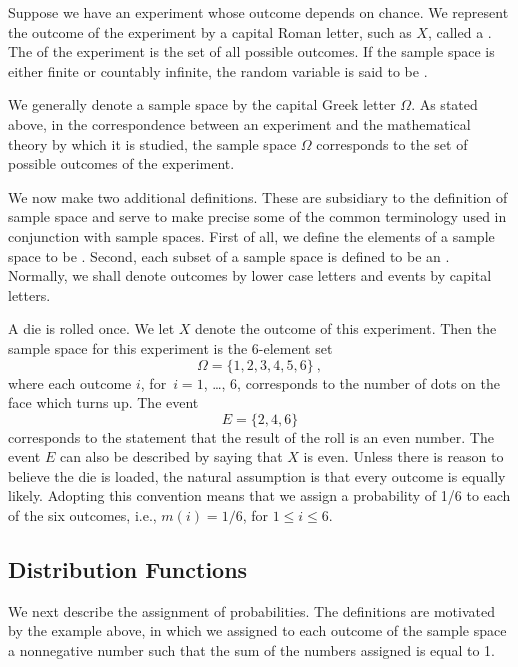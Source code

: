 \begin{definition}\label{def 1.1} 
Suppose we have an experiment whose outcome depends on chance.
We represent the outcome of the experiment by
a capital Roman letter, such as $X$, called a .
The  of the experiment is the set of all possible 
outcomes.  If the sample space is either finite or countably infinite, the random variable
is said to be .
\end{definition}
We generally denote a sample space by the capital Greek letter $\Omega$.  As
stated above, in the correspondence between an experiment and the
mathematical theory by which it is studied, the sample space $\Omega$ corresponds to the
set of possible outcomes of the experiment.    
\par
We now make two additional definitions.  These are subsidiary to the
definition of sample space and serve to make precise some of the common terminology used
in conjunction with sample spaces.  First of all, we define the elements of a sample space
to be .  Second, each subset of a sample space is defined to be 
an . Normally, we shall denote outcomes by lower case letters and
events  by capital letters.
 
\begin{example}\label{exam 1.5}
A die is rolled once.  We let $X$ denote the outcome of this experiment.  Then the sample
space for this experiment is the 6-element set
$$
\Omega = \{1,2,3,4,5,6\}\ ,
$$
where each outcome $i$, for~$i = 1$, \dots, 6, corresponds to the number of
dots on the face which turns up.  The event
$$
E = \{2,4,6\}
$$
corresponds to the statement that the result of the roll is an even number.  The event $E$
can also be described by saying that $X$ is even.  Unless there is reason to believe the die is
loaded, the natural assumption is that every outcome is equally likely.  Adopting this
convention means that we assign a probability of 1/6 to each of the six outcomes, i.e., $m(i) =
1/6$, for $1 \le i \le 6$.
\end{example}

\subsection*{Distribution Functions}

We next describe the assignment of probabilities.  The definitions are
motivated by the example above, in which we assigned to each outcome of the
sample space a nonnegative number such that the sum of the numbers assigned
is equal to 1.

